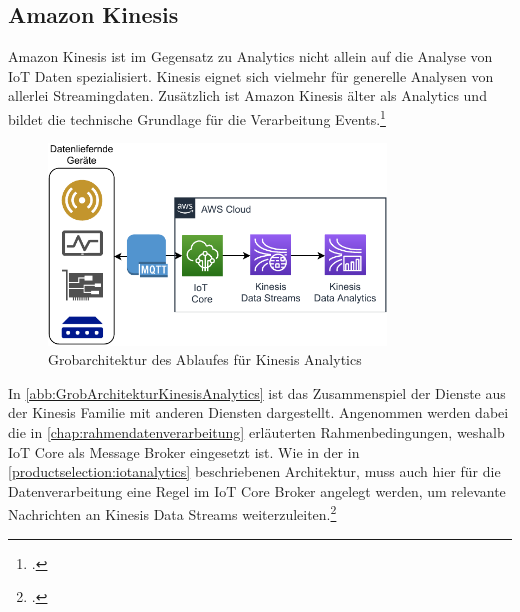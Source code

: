 \subsection{Amazon Kinesis}
Amazon Kinesis ist im Gegensatz zu \AWSIOT Analytics nicht allein auf die Analyse von \ac{IoT} Daten spezialisiert. Kinesis eignet sich vielmehr für generelle Analysen von allerlei Streamingdaten. Zusätzlich ist Amazon Kinesis älter als \AWSIOT Analytics und bildet die technische Grundlage für die Verarbeitung \AWSIOT Events.\footcite[Vgl.][]{Pogosova.28.05.2020}

\begin{figure}[H]
\centering
\includegraphics[width=0.8\textwidth]{graphics/Kinesis-Analytics-general.pdf}
\caption{Grobarchitektur des Ablaufes für Kinesis Analytics}
\label{abb:GrobArchitekturKinesisAnalytics}
\end{figure}
In \autoref{abb:GrobArchitekturKinesisAnalytics} ist das Zusammenspiel der Dienste aus der Kinesis Familie mit anderen Diensten dargestellt. Angenommen werden dabei die in \autoref{chap:rahmendatenverarbeitung} erläuterten Rahmenbedingungen, weshalb \ac{IoT} Core als Message Broker eingesetzt ist. Wie in der in \autoref{productselection:iotanalytics} beschriebenen Architektur, muss auch hier für die Datenverarbeitung eine Regel im \ac{IoT} Core Broker angelegt werden, um relevante Nachrichten an Kinesis Data Streams weiterzuleiten.\footcite[Vgl.][]{AmazonWebServicesInc..o.J.}

